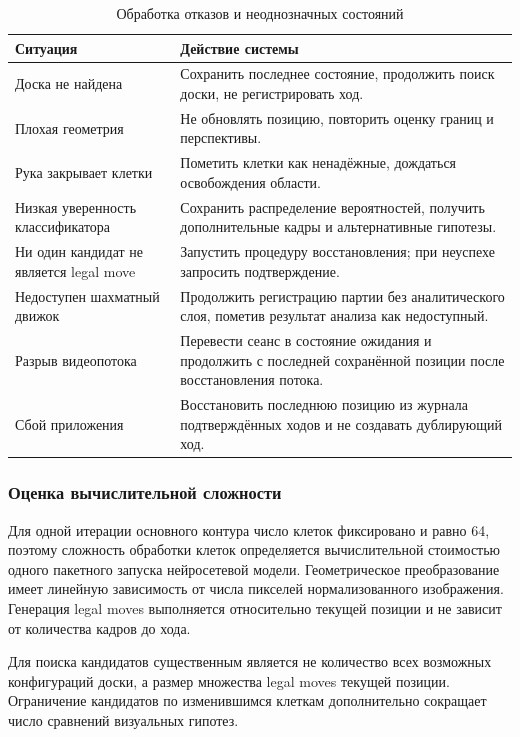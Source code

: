 \begin{table}[htbp]
\centering
\caption{Обработка отказов и неоднозначных состояний}
\begin{tabular}{|>{\raggedright\arraybackslash}p{}|>{\raggedright\arraybackslash}p{}|}
\hline
\textbf{Ситуация} & \textbf{Действие системы} \\
\hline
Доска не найдена & Сохранить последнее состояние, продолжить поиск доски, не регистрировать ход. \\
\hline
Плохая геометрия & Не обновлять позицию, повторить оценку границ и перспективы. \\
\hline
Рука закрывает клетки & Пометить клетки как ненадёжные, дождаться освобождения области. \\
\hline
Низкая уверенность классификатора & Сохранить распределение вероятностей, получить дополнительные кадры и альтернативные гипотезы. \\
\hline
Ни один кандидат не является legal move & Запустить процедуру восстановления; при неуспехе запросить подтверждение. \\
\hline
Недоступен шахматный движок & Продолжить регистрацию партии без аналитического слоя, пометив результат анализа как недоступный. \\
\hline
Разрыв видеопотока & Перевести сеанс в состояние ожидания и продолжить с последней сохранённой позиции после восстановления потока. \\
\hline
Сбой приложения & Восстановить последнюю позицию из журнала подтверждённых ходов и не создавать дублирующий ход. \\
\hline
\end{tabular}
\end{table}

\subsubsection{Оценка вычислительной сложности}

Для одной итерации основного контура число клеток фиксировано и равно 64, поэтому сложность обработки клеток определяется вычислительной стоимостью одного пакетного запуска нейросетевой модели. Геометрическое преобразование имеет линейную зависимость от числа пикселей нормализованного изображения. Генерация legal moves выполняется относительно текущей позиции и не зависит от количества кадров до хода.

Для поиска кандидатов существенным является не количество всех возможных конфигураций доски, а размер множества legal moves текущей позиции. Ограничение кандидатов по изменившимся клеткам дополнительно сокращает число сравнений визуальных гипотез.

